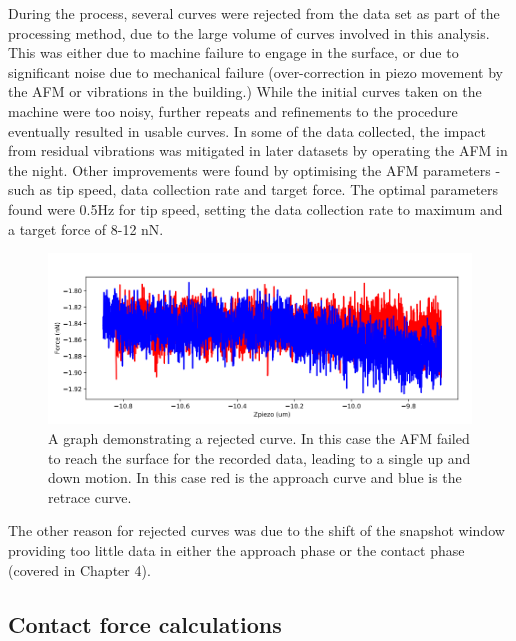  During the process, several curves were rejected from the data set as part of the processing method, due to the large volume of curves involved in this analysis. This was either due to machine failure to engage in the surface, or due to significant noise due to mechanical failure (over-correction in piezo movement by the AFM or vibrations in the building.) While the initial curves taken on the machine were too noisy, further repeats and refinements to the procedure eventually resulted in usable curves. In some of the data collected, the impact from residual vibrations was mitigated in later datasets by operating the AFM in the night. Other improvements were found by optimising the AFM parameters  - such as tip speed, data collection rate and target force. The optimal parameters found were 0.5Hz for tip speed, setting the data collection rate to maximum and a target force of 8-12 nN. 

\begin{figure}
    \centering
    \includegraphics[width=0.65\linewidth]{chapter5/miss_error.png}
    \caption{A graph demonstrating a rejected curve. In this case the AFM failed to reach the surface for the recorded data, leading to a single up and down motion. In this case red is the approach curve and blue is the retrace curve.}
    \label{fig:miss-error}
\end{figure}

The other reason for rejected curves was due to the shift of the snapshot window providing too little data in either the approach phase or the contact phase (covered in Chapter 4). 

\subsection{Contact force calculations}

